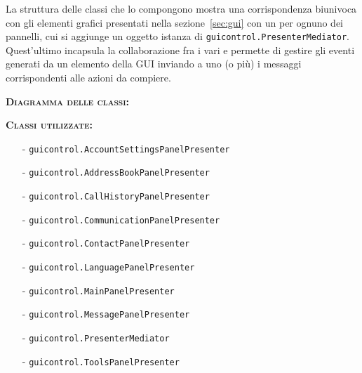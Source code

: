 \begin{description}
La struttura delle classi che lo compongono mostra una corrispondenza biunivoca con gli elementi grafici presentati nella sezione~\ref{sec:gui} con un  per ognuno dei pannelli, cui si aggiunge un oggetto istanza di \texttt{guicontrol.PresenterMediator}. Quest'ultimo incapsula la collaborazione fra i vari  e permette di gestire gli eventi generati da un elemento della GUI inviando a uno (o più)  i messaggi corrispondenti alle azioni da compiere.
	\item{\scshape\bfseries Diagramma delle classi:}\\
	\item{\scshape\bfseries Classi utilizzate:}\\
	\begin{itemize}[noitemsep,nolistsep]
	  \item[-] \texttt{guicontrol.AccountSettingsPanelPresenter}
	  \item[-] \texttt{guicontrol.AddressBookPanelPresenter}
	  \item[-] \texttt{guicontrol.CallHistoryPanelPresenter}
	  \item[-] \texttt{guicontrol.CommunicationPanelPresenter}
	  \item[-] \texttt{guicontrol.ContactPanelPresenter}
	  \item[-] \texttt{guicontrol.LanguagePanelPresenter}
	  \item[-] \texttt{guicontrol.MainPanelPresenter}
		\item[-] \texttt{guicontrol.MessagePanelPresenter}
		\item[-] \texttt{guicontrol.PresenterMediator}
	  \item[-] \texttt{guicontrol.ToolsPanelPresenter}
	\end{itemize}
\end{description}

